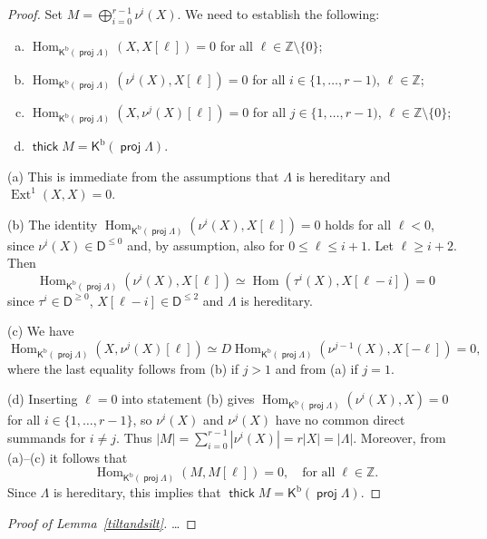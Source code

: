\documentclass[a4paper,reqno,11pt]{amsart}
\theoremstyle{definition}
\newcommand{\DDD}{\mathsf{D}}
\newcommand{\KKK}{\mathsf{K}}
\newcommand{\Z}{\mathbb{Z}}
\newcommand{\Ext}{\operatorname{Ext}\nolimits}
\newcommand{\Hom}{\operatorname{Hom}\nolimits}
\newcommand{\gl}{\operatorname{gl.\!dim}\nolimits}
\DeclareMathOperator{\proj}{\mathsf{proj}}
\newcommand{\Kb}{\KKK^{\mathrm{b}}}
\DeclareMathOperator{\thick}{\mathsf{thick}}
\newcommand\kbpl{\Kb(\proj\Lambda)}
\newcommand{\new}[1]{{\blue #1}}
\numberwithin{equation}{section}
\begin{document}
\new{
\begin{proof}
  Set $M= \bigoplus_{i=0}^{r-1}\nu^i(X)$.
  We need to establish the following:
\begin{enumerate}[a)]
\item $\Hom_{\kbpl}(X,X[\ell]) = 0$ for all $\ell\in\Z\setminus\{0\}$;
\item $\Hom_{\kbpl}(\nu^i(X),X[\ell])=0$ for all $i\in\{1,\ldots,r-1)$, $\ell\in\Z$;
\item $\Hom_{\kbpl}(X,\nu^j(X)[\ell])=0$ for all $j\in\{1,\ldots,r-1)$, $\ell\in\Z\setminus\{0\}$;
\item $\thick M  = \kbpl$.
\end{enumerate}

(a)
This is immediate from the assumptions that $\Lambda$ is hereditary and $\Ext^1(X,X)=0$.

(b)
The identity $\Hom_{\kbpl}(\nu^i(X),X[\ell])=0$ holds for all $\ell<0$, since $\nu^i(X)\in\DDD^{\le0}$ and, by assumption, also for $0\le\ell \le i+1$. 
Let $\ell\ge i+2$. Then
\[\Hom_{\kbpl}(\nu^i(X),X[\ell]) \simeq \Hom(\tau^i(X), X[\ell-i]) =0 \]
since $\tau^i\in\DDD^{\ge0}$, $X[\ell-i]\in\DDD^{\le2}$ and $\Lambda$ is hereditary.

(c)
We have
\[ \Hom_{\kbpl}(X,\nu^j(X)[\ell]) \simeq D \Hom_{\kbpl}(\nu^{j-1}(X), X[-\ell]) =0 ,\]
where the last equality follows from (b) if $j>1$ and from (a) if $j=1$.

(d)
Inserting $\ell=0$ into statement (b) gives $\Hom_{\kbpl}(\nu^i(X),X)=0$ for all $i\in\{1,\ldots,r-1\}$, so $\nu^i(X)$ and $\nu^j(X)$ have no common direct summands for $i\ne j$.
Thus
$|M|=\sum_{i=0}^{r-1}\left|\nu^i(X)\right| = r|X| = |\Lambda|$.
Moreover, from (a)--(c) it follows that
\[\Hom_{\kbpl}\left(M, M[\ell]\right) = 0,\quad \mbox{for all}\; \ell\in\Z.\]
Since $\Lambda$ is hereditary, this implies \cite{} that $\thick M = \kbpl$.
\end{proof}
}


\begin{proof}[Proof of Lemma~\ref{tiltandsilt}]
  \ldots
\end{proof}
\end{document}
